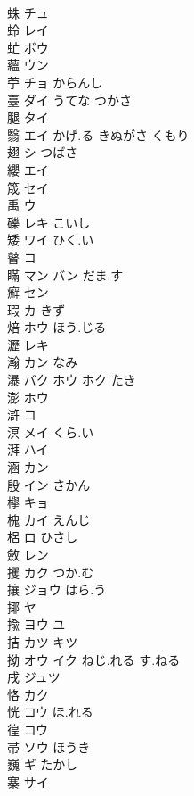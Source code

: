 \documentclass[8pt]{extreport}
\begin{document}
\begin{CJK}{UTF8}{min}
\\	蛛	チュ			
\\	蛉	レイ			
\\	虻	ボウ			
\\	蘊	ウン			
\\	苧	チョ からんし			
\\	臺	ダイ うてな つかさ			
\\	腿	タイ			
\\	翳	エイ かげ.る きぬがさ くもり			
\\	翅	シ つばさ			
\\	纓	エイ			
\\	筬	セイ			
\\	禹	ウ			
\\	礫	レキ こいし			
\\	矮	ワイ ひく.い			
\\	瞽	コ			
\\	瞞	マン バン だま.す			
\\	癬	セン			
\\	瑕	カ きず			
\\	焙	ホウ ほう.じる			
\\	瀝	レキ			
\\	瀚	カン なみ			
\\	瀑	バク ホウ ホク たき			
\\	澎	ホウ			
\\	滸	コ			
\\	溟	メイ くら.い			
\\	湃	ハイ			
\\	涵	カン			
\\	殷	イン さかん			
\\	欅	キョ			
\\	槐	カイ えんじ			
\\	梠	ロ ひさし			
\\	斂	レン			
\\	攫	カク つか.む			
\\	攘	ジョウ はら.う			
\\	揶	ヤ			
\\	揄	ヨウ ユ			
\\	拮	カツ キツ			
\\	拗	オウ イク ねじ.れる す.ねる			
\\	戌	ジュツ			
\\	恪	カク			
\\	恍	コウ ほ.れる			
\\	徨	コウ			
\\	帚	ソウ ほうき			
\\	巍	ギ たかし			
\\	寨	サイ			

\end{CJK}
\end{document}
